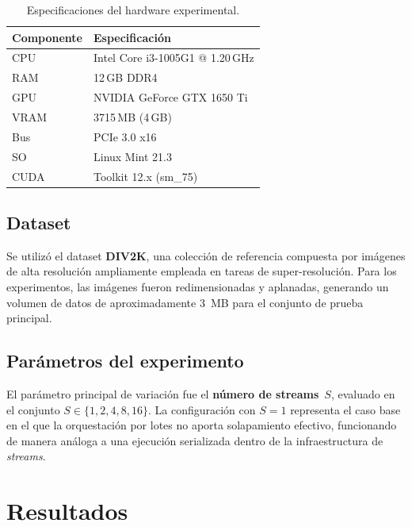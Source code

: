 \documentclass[12pt, a4paper]{article}
\begin{document}
\begin{table}[H]
    \centering
    \caption{Especificaciones del hardware experimental.}
    \label{tab:hardware}
    \begin{tabular}{@{} l l @{}}
        \toprule
        \textbf{Componente} & \textbf{Especificación} \\
        \midrule
        CPU     & Intel Core i3-1005G1 @ 1.20\,GHz \\
        RAM     & 12\,GB DDR4 \\
        GPU     & NVIDIA GeForce GTX 1650 Ti \\
        VRAM    & 3715\,MB (4\,GB) \\
        Bus     & PCIe 3.0 x16 \\
        SO      & Linux Mint 21.3 \\
        CUDA    & Toolkit 12.x (sm\_75) \\
        \bottomrule
    \end{tabular}
\end{table}

\subsection{Dataset}

Se utilizó el dataset \textbf{DIV2K}, una colección de referencia compuesta por
imágenes de alta resolución ampliamente empleada en tareas de
super-resolución. Para los experimentos, las imágenes fueron redimensionadas y
aplanadas, generando un volumen de datos de aproximadamente 3~MB para el
conjunto de prueba principal.

\subsection{Parámetros del experimento}

El parámetro principal de variación fue el \textbf{número de streams}~$S$,
evaluado en el conjunto $S \in \{1, 2, 4, 8, 16\}$. La configuración con
$S = 1$ representa el caso base en el que la orquestación por lotes no aporta
solapamiento efectivo, funcionando de manera análoga a una ejecución
serializada dentro de la infraestructura de \textit{streams}.

\section{Resultados}
\end{document}
